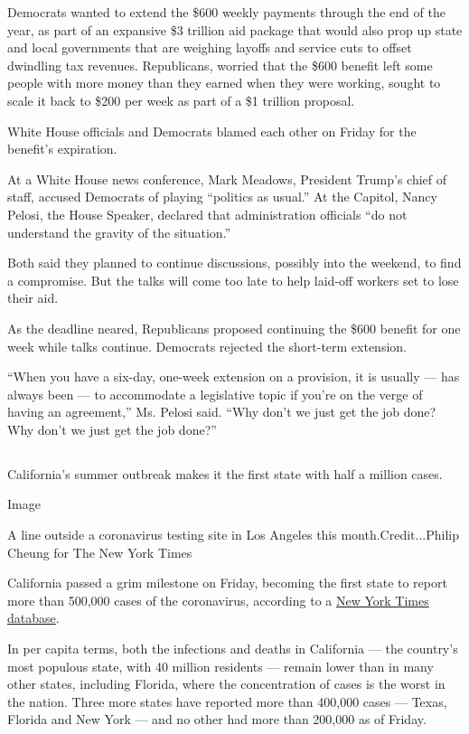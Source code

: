 Democrats wanted to extend the \$600 weekly payments through the end of
the year, as part of an expansive \$3 trillion aid package that would
also prop up state and local governments that are weighing layoffs and
service cuts to offset dwindling tax revenues. Republicans, worried that
the \$600 benefit left some people with more money than they earned when
they were working, sought to scale it back to \$200 per week as part of
a \$1 trillion proposal.

White House officials and Democrats blamed each other on Friday for the
benefit's expiration.

At a White House news conference, Mark Meadows, President Trump's chief
of staff, accused Democrats of playing ``politics as usual.'' At the
Capitol, Nancy Pelosi, the House Speaker, declared that administration
officials ``do not understand the gravity of the situation.''

Both said they planned to continue discussions, possibly into the
weekend, to find a compromise. But the talks will come too late to help
laid-off workers set to lose their aid.

As the deadline neared, Republicans proposed continuing the \$600
benefit for one week while talks continue. Democrats rejected the
short-term extension.

``When you have a six-day, one-week extension on a provision, it is
usually --- has always been --- to accommodate a legislative topic if
you're on the verge of having an agreement,'' Ms. Pelosi said. ``Why
don't we just get the job done? Why don't we just get the job done?''

\hypertarget{-1}{%
\subsection{}\label{-1}}

California's summer outbreak makes it the first state with half a
million cases.

Image

A line outside a coronavirus testing site in Los Angeles this
month.Credit...Philip Cheung for The New York Times

California passed a grim milestone on Friday, becoming the first state
to report more than 500,000 cases of the coronavirus, according to a
\href{https://www.nytimes3xbfgragh.onion/interactive/2020/us/coronavirus-us-cases.html\#states}{New
York Times database}.

In per capita terms, both the infections and deaths in California ---
the country's most populous state, with 40 million residents --- remain
lower than in many other states, including Florida, where the
concentration of cases is the worst in the nation. Three more states
have reported more than 400,000 cases --- Texas, Florida and New York
--- and no other had more than 200,000 as of Friday.

